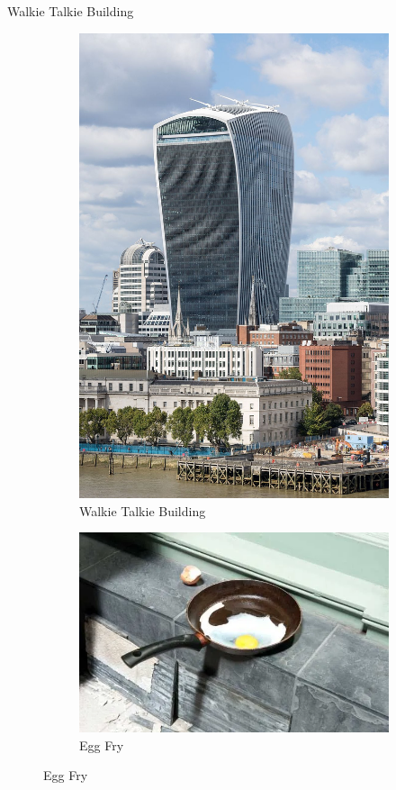 \documentclass{beamer}
\begin{document}
\begin{frame}{Walkie Talkie Building}
	\begin{figure}
		\centering
		\begin{subfigure}[b]{0.4\textwidth}
			\centering
			\includegraphics[width=\textwidth]{42.jpeg}
			\caption{Walkie Talkie Building}
			\label{Refraction}
		\end{subfigure}
		\hfill
		\begin{subfigure}[b]{0.4\textwidth}
			\centering
			\includegraphics[width=\textwidth]{43.png}
			\caption{Egg Fry}
			\label{Bending Direction}
		\end{subfigure}
	\end{figure}
\end{frame}
\end{document}
